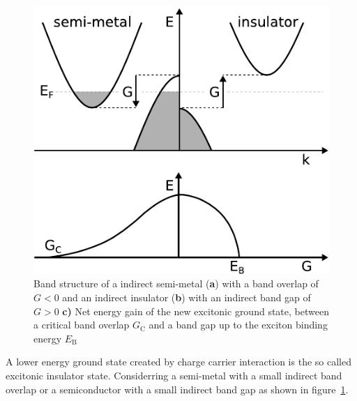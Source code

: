 \begin{figure}[!t]
	\begin{minipage}{0.5\columnwidth}
		\includegraphics[width=\columnwidth]{figs/excitonic_insulator.pdf}
	\end{minipage}
	\hspace{0.04\columnwidth}
	\begin{minipage}{0.45\columnwidth}
		\caption{Band structure of a indirect semi-metal (\textbf{a}) with a band overlap of $G<0$ and an indirect insulator (\textbf{b}) with an indirect band gap of $G>0$ \textbf{c)} Net energy gain of the new excitonic ground state, between a critical band overlap $G_\mathrm{C}$ and a band gap up to the exciton binding energy $E_\mathrm{B}$}
		\label{fig:ei}
	\end{minipage}
\end{figure}

A lower energy ground state created by charge carrier interaction is the so called excitonic insulator state.
Considerring a semi-metal with a small indirect band overlap or a semiconductor with a small indirect band gap as shown in figure~\ref{fig:ei}.



